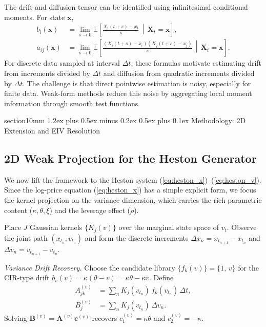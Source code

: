 \documentclass[reprint, amsmath, amssymb, aps, prl, superscriptaddress, nofootinbib]{revtex4-2}
\makeatletter
\newcommand{\E}{\mathbb{E}}
\newcommand{\dt}{\Delta t}
\newcommand{\given}{\,\middle|\,}
\def\section{\@startsection
  {section}{1}{0mm}
  {1.2ex plus 0.5ex minus 0.2ex}
  {0.5ex plus 0.1ex}
  {\centering\normalfont\small\bfseries}}
\makeatother
\begin{document}
The drift and diffusion tensor can be identified using infinitesimal
conditional moments. For state $\mathbf{x}$,
\begin{align}
  b_i(\mathbf{x})
  &=
  \lim_{s\to 0}
  \E\left[
  \frac{X_i(t+s)-x_i}{s}
  \given
  \mathbf{X}_t=\mathbf{x}
  \right],
  \label{eq:km-drift}
  \\
  a_{ij}(\mathbf{x})
  &=
  \lim_{s\to 0}
  \E\left[
  \frac{(X_i(t+s)-x_i)(X_j(t+s)-x_j)}{s}
  \given
  \mathbf{X}_t=\mathbf{x}
  \right].
  \label{eq:km-diffusion}
\end{align}
For discrete data sampled at interval $\dt$, these formulas motivate estimating
drift from increments divided by $\dt$ and diffusion from quadratic increments
divided by $\dt$. The challenge is that direct pointwise estimation is noisy,
especially for finite data. Weak-form methods reduce this noise by aggregating
local moment information through smooth test functions.


\section{Methodology: 2D Extension and EIV Resolution}

\subsection{2D Weak Projection for the Heston Generator}

We now lift the framework to the Heston system (\ref{eq:heston_x})--(\ref{eq:heston_v}).
Since the log-price equation (\ref{eq:heston_x}) has a simple explicit form, we focus
the kernel projection on the variance dimension, which carries the rich parametric
content ($\kappa,\theta,\xi$) and the leverage effect ($\rho$).

Place $J$ Gaussian kernels $\{K_j(v)\}$ over the marginal state space of $v_t$.
Observe the joint path $(x_{t_n}, v_{t_n})$ and form the discrete increments
$\Delta x_n = x_{t_{n+1}}-x_{t_n}$ and $\Delta v_n = v_{t_{n+1}}-v_{t_n}$.

\textit{Variance Drift Recovery.}
Choose the candidate library $\{f_k(v)\} = \{1,\, v\}$ for the CIR-type drift
$b_v(v) = \kappa(\theta - v) = \kappa\theta - \kappa v$. Define
\begin{align}
  A_{jk}^{(v)} &= \sum_{n} K_j(v_{t_n})\,f_k(v_{t_n})\,\Delta t, \label{eq:Av_jk}\\
  B_j^{(v)} &= \sum_{n} K_j(v_{t_n})\,\Delta v_n. \label{eq:Bv_j}
\end{align}
Solving $\mathbf{B}^{(v)} = \mathbf{A}^{(v)}\mathbf{c}^{(v)}$ recovers
$c^{(v)}_1 = \kappa\theta$ and $c^{(v)}_2 = -\kappa$.
\end{document}
